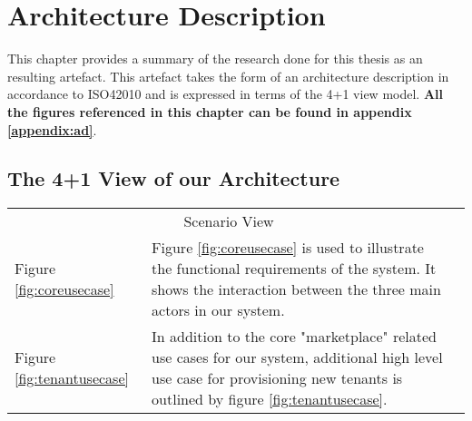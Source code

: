 \chapter{Architecture Description}
\label{chap:ad}
This chapter provides a summary of the research done for this thesis as an resulting artefact. This artefact takes the form of an architecture description in accordance to ISO42010 and is expressed in terms of the 4+1 view model. \textbf{All the figures referenced in this chapter can be found in appendix \ref{appendix:ad}}.

\section{The 4+1 View of our Architecture}

\begin{table}[htp]
\centering
\begin{tabularx}{\textwidth}{lXl}
\cline{1-2}
\multicolumn{2}{|c|}{\cellcolor[HTML]{EFEFEF}Scenario View} &  \\ \cline{1-2}
\multicolumn{1}{|l|}{Figure \ref{fig:coreusecase}} & \multicolumn{1}{X|}{Figure \ref{fig:coreusecase} is used to illustrate the functional requirements of the system. It shows the interaction between the three main actors in our system.} &  \\ \cline{1-2}
\multicolumn{1}{|l|}{Figure \ref{fig:tenantusecase}} & \multicolumn{1}{X|}{In addition to the core "marketplace" related use cases for our system, additional high level use case for provisioning new tenants is outlined by figure \ref{fig:tenantusecase}.} & \\
\cline{1-2}
\end{tabularx}
\label{tab:scenarioview}
\end{table}

